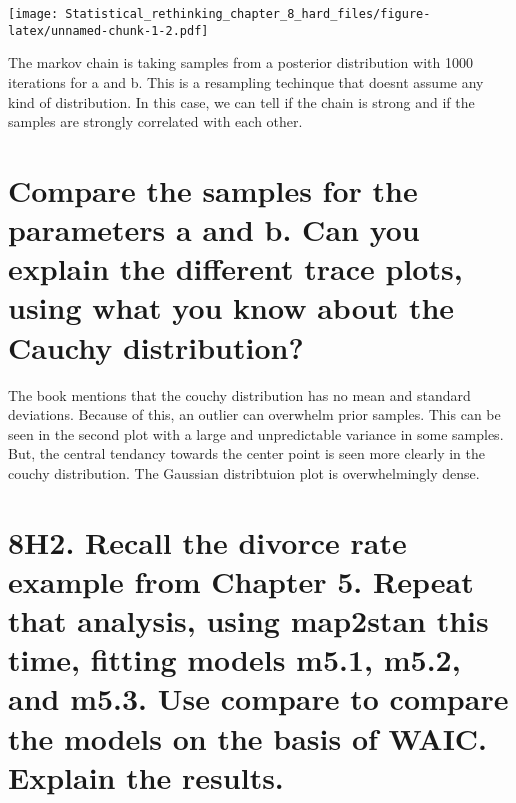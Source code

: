 \documentclass[]{article}
\newenvironment{Shaded}{\begin{snugshade}}{\end{snugshade}}
\newcommand{\KeywordTok}[1]{\textcolor[rgb]{0.13,0.29,0.53}{\textbf{#1}}}
\newcommand{\DataTypeTok}[1]{\textcolor[rgb]{0.13,0.29,0.53}{#1}}
\newcommand{\DecValTok}[1]{\textcolor[rgb]{0.00,0.00,0.81}{#1}}
\newcommand{\OperatorTok}[1]{\textcolor[rgb]{0.81,0.36,0.00}{\textbf{#1}}}
\newcommand{\NormalTok}[1]{#1}
\begin{document}
\begin{Shaded}
\end{Shaded}

\texttt{[image: Statistical\_rethinking\_chapter\_8\_hard\_files/figure-latex/unnamed-chunk-1-2.pdf]}

The markov chain is taking samples from a posterior distribution with
1000 iterations for a and b. This is a resampling techinque that doesnt
assume any kind of distribution. In this case, we can tell if the chain
is strong and if the samples are strongly correlated with each other.

\section{Compare the samples for the parameters a and b. Can you explain
the different trace plots, using what you know about the Cauchy
distribution?}\label{compare-the-samples-for-the-parameters-a-and-b.-can-you-explain-the-different-trace-plots-using-what-you-know-about-the-cauchy-distribution}

The book mentions that the couchy distribution has no mean and standard
deviations. Because of this, an outlier can overwhelm prior samples.
This can be seen in the second plot with a large and unpredictable
variance in some samples. But, the central tendancy towards the center
point is seen more clearly in the couchy distribution. The Gaussian
distribtuion plot is overwhelmingly dense.

\section{8H2. Recall the divorce rate example from Chapter 5. Repeat
that analysis, using map2stan this time, fitting models m5.1, m5.2, and
m5.3. Use compare to compare the models on the basis of WAIC. Explain
the
results.}\label{h2.-recall-the-divorce-rate-example-from-chapter-5.-repeat-that-analysis-using-map2stan-this-time-fitting-models-m5.1-m5.2-and-m5.3.-use-compare-to-compare-the-models-on-the-basis-of-waic.-explain-the-results.}
\end{document}

